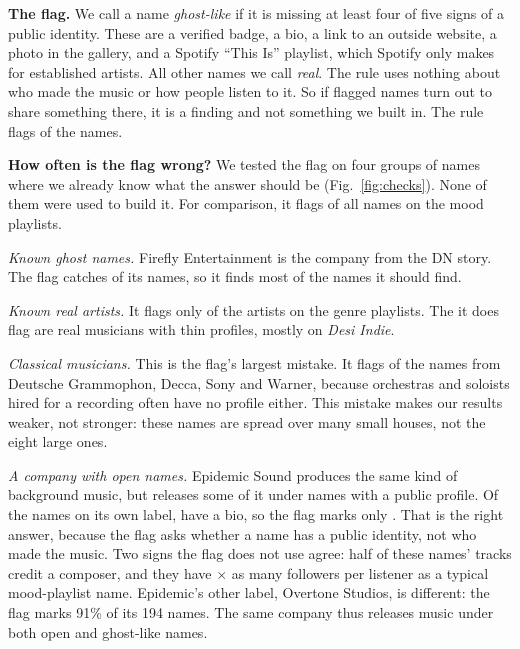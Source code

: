 \documentclass[9pt,twocolumn,twoside]{pnas-new}
\begin{document}
\textbf{The flag.} We call a name \emph{ghost-like} if it is missing at least four of five signs of a public identity. These are a verified badge, a bio, a link to an outside website, a photo in the gallery, and a Spotify ``This Is'' playlist, which Spotify only makes for established artists. All other names we call \emph{real}. The rule uses nothing about who made the music or how people listen to it. So if flagged names turn out to share something there, it is a finding and not something we built in. The rule flags \nGhost{} of the \nNames{} names.

\textbf{How often is the flag wrong?} We tested the flag on four groups of names where we already know what the answer should be (Fig.~\ref{fig:checks}). None of them were used to build it. For comparison, it flags \ghostShareNamesF{} of all names on the mood playlists.

\emph{Known ghost names.} Firefly Entertainment is the company from the DN story. The flag catches  of its \nFirefly{} names, so it finds most of the names it should find.

\emph{Known real artists.} It flags only  of the \nGenreNames{} artists on the genre playlists. The \nGenreFlagged{} it does flag are real musicians with thin profiles, mostly on \emph{Desi Indie}.

\emph{Classical musicians.} This is the flag's largest mistake. It flags  of the \nMajors{} names from Deutsche Grammophon, Decca, Sony and Warner, because orchestras and soloists hired for a recording often have no profile either. This mistake makes our results weaker, not stronger: these names are spread over many small houses, not the eight large ones.

\emph{A company with open names.} Epidemic Sound produces the same kind of background music, but releases some of it under names with a public profile. Of the \nEpidemic{} names on its own label, \epidemicBio{} have a bio, so the flag marks only . That is the right answer, because the flag asks whether a name has a public identity, not who made the music. Two signs the flag does not use agree: half of these names' tracks credit a composer, and they have \epidemicFplRatio$\times$ as many followers per listener as a typical mood-playlist name. Epidemic's other label, Overtone Studios, is different: the flag marks 91\% of its 194 names. The same company thus releases music under both open and ghost-like names.
\end{document}
